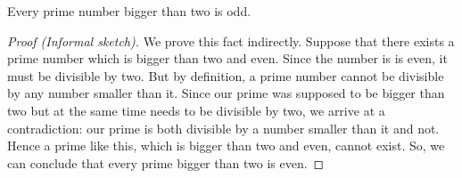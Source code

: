 \begin{enumerate}
		\begin{proposition}
		Every prime number bigger than two is odd.
		\end{proposition}
		\begin{proof}[Proof (Informal sketch)]
		We prove this fact indirectly. Suppose that there exists a prime number which is bigger than two and even. Since the number is is even, it must be divisible by two. But by definition, a prime number cannot be divisible by any number smaller than it. Since our prime was supposed to be bigger than two but at the same time needs to be divisible by two, we arrive at a contradiction: our prime is both divisible by a number smaller than it and not. Hence a prime like this, which is bigger than two and even, cannot exist. So, we can conclude that every prime bigger than two is even.
				\end{proof}

	\end{enumerate}
	
